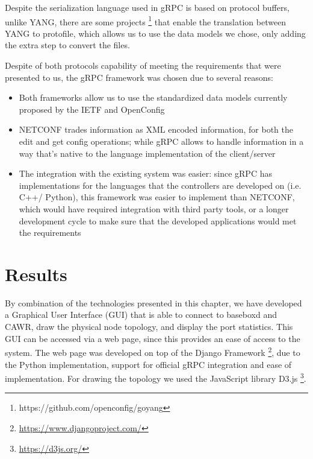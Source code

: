 \par Despite the serialization language used in gRPC is based on protocol buffers, unlike YANG, there are some projects
\footnote {https://github.com/openconfig/goyang} that enable the translation between YANG to protofile, which allows us to use the data models we chose, only adding
the extra step to convert the files.

\par Despite of both protocols capability of meeting the requirements that were presented to us, the gRPC framework was chosen due to several reasons:

\begin {itemize}
    \item Both frameworks allow us to use the standardized data models currently proposed by the IETF and OpenConfig
    \item NETCONF trades information as XML encoded information, for both the edit and get config operations; while gRPC allows to handle information in a way
        that’s native to the language implementation of the client/server
    \item The integration with the existing system was easier: since gRPC has implementations for the languages that the controllers are developed on
        (i.e. C++/ Python), this framework was easier to implement 
        than NETCONF, which would have required integration with third party tools, or a longer development cycle to make sure that the developed applications would
        met the requirements
\end {itemize}

\section {Results}

By combination of the technologies presented in this chapter, we have developed a Graphical User Interface (GUI) that is able to connect to baseboxd and CAWR,
draw the physical node topology, and display the port statistics. This GUI can be accessed via a web page, since this provides an ease of access to the system. 
The web page was developed on top of the Django Framework \footnote{\url{https://www.djangoproject.com/}}, due to the Python implementation, support for official
gRPC integration and ease of implementation. For drawing the topology we used the JavaScript library D3.js \footnote{\url{https://d3js.org/}}.

